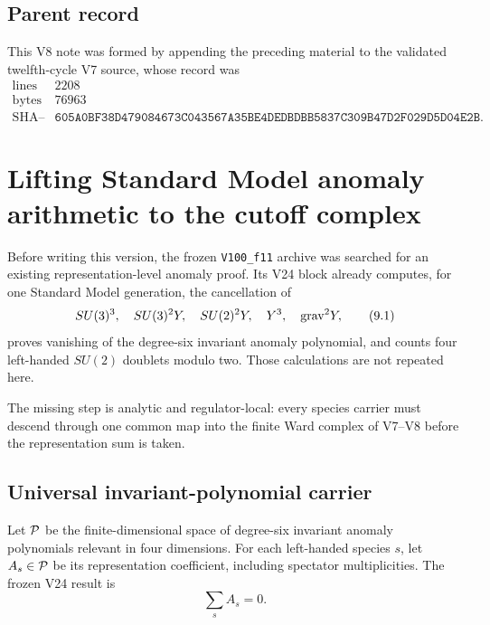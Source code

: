 \documentclass[11pt]{article}
\theoremstyle{remark}
\begin{document}
\subsection{Parent record}

This V8 note was formed by appending the preceding material to the
validated twelfth-cycle V7 source, whose record was
\[
\begin{array}{c|c}
\text{lines}&2208\\
\text{bytes}&76963\\
\text{SHA--256}&
\texttt{605A0BF38D479084673C043567A35BE4DEDBDBB5837C309B47D2F029D5D04E2B}.
\end{array}                                                     \tag{8.24}
\]


\section{Lifting Standard Model anomaly arithmetic to the cutoff complex}
\label{sec:v12v9}

Before writing this version, the frozen
\texttt{V100\_f11} archive was searched for an existing
representation-level anomaly proof.  Its V24 block already computes,
for one Standard Model generation, the cancellation of
\[
 SU(3)^3,\quad SU(3)^2Y,\quad SU(2)^2Y,\quad
 Y^3,\quad {\rm grav}^2Y,                                   \tag{9.1}
\]
proves vanishing of the degree-six invariant anomaly polynomial, and
counts four left-handed \(SU(2)\) doublets modulo two.  Those
calculations are not repeated here.

The missing step is analytic and regulator-local: every species
carrier must descend through one common map into the finite Ward
complex of V7--V8 before the representation sum is taken.

\subsection{Universal invariant-polynomial carrier}

Let \({\cal P}\) be the finite-dimensional space of degree-six
invariant anomaly polynomials relevant in four dimensions.  For each
left-handed species \(s\), let \(A_s\in{\cal P}\) be its
representation coefficient, including spectator multiplicities.
The frozen V24 result is
\[
                              \sum_sA_s=0.                   \tag{9.2}
\]
\end{document}

